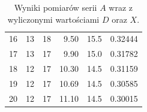 \documentclass[a4paper]{article}
\begin{document}
\begin{table}
\begin{tabular}{lrrrrr}
16 &          13 &          18 &      9.50 &      15.5 &                     0.32444 \\
17 &          13 &          17 &      9.90 &      15.0 &                     0.31782 \\
18 &          12 &          17 &     10.30 &      14.5 &                     0.31159 \\
19 &          12 &          17 &     10.69 &      14.5 &                     0.30585 \\
20 &          12 &          17 &     11.10 &      14.5 &                     0.30015 \\
\bottomrule
\end{tabular}

\caption{Wyniki pomiarów serii $A$ wraz z wyliczonymi wartościami $D$ oraz $X$.}
\label{seria_A}
\end{table}
\end{document}
